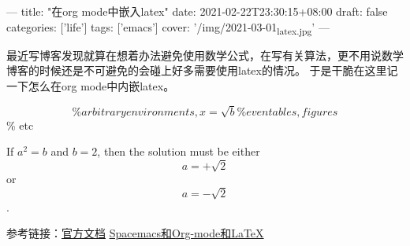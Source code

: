 \documentclass[11pt]{article}
\date{\today}
\title{}
\begin{document}
\tableofcontents

---
title: "在org mode中嵌入latex"
date: 2021-02-22T23:30:15+08:00
draft: false
categories: ['life']
tags: ['emacs']
cover: '/img/2021-03-01\textsubscript{latex.jpg}'
---

最近写博客发现就算在想着办法避免使用数学公式，在写有关算法，更不用说数学博客的时候还是不可避免的会碰上好多需要使用latex的情况。
于是干脆在这里记一下怎么在org mode中内嵌latex。


\begin{equation}                        \% arbitrary environments,
x=\sqrt{b}                              \% even tables, figures
\end{equation}                          \% etc

If \(a^2=b\) and \(b=2\), then the solution must be
either $$ a=+\sqrt{2} $$ or \[ a=-\sqrt{2} \].



参考链接：\href{https://orgmode.org/manual/Embedded-LaTeX.html}{官方文档} \href{https://blog.poi.cat/post/spacemacs-plus-org-mode-plus-latex}{Spacemacs和Org-mode和\LaTeX{}}
\end{document}
